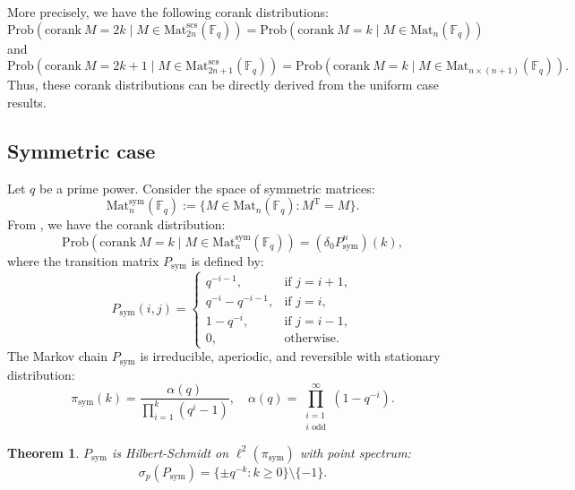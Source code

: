 \documentclass[a4]{amsart}
\newcommand{\Prob}{{\mathrm{Prob}}}
\newcommand{\Mat}{{\mathrm{Mat}}}
\newcommand{\scs}{\mathrm{scs}}
\newcommand{\corank}{\mathrm{corank~}}
\newcommand{\sym}{\mathrm{sym}}
\newcommand{\T}{\mathrm{T}}
\newtheorem{theorem}{Theorem}
\theoremstyle{remark} \newtheorem{remark}[theorem]{Remark}
\begin{document}
More precisely, we have the following corank distributions:
\[
\Prob(\corank M = 2k \mid M \in \Mat_{2n}^{\scs}(\mathbb{F}_q)) = \Prob(\corank M = k \mid M \in \Mat_n(\mathbb{F}_q))
\]
and
\[
\Prob(\corank M = 2k+1 \mid M \in \Mat_{2n+1}^{\scs}(\mathbb{F}_q)) = \Prob(\corank M = k \mid M \in \Mat_{n \times (n+1)}(\mathbb{F}_q)).
\]
Thus, these corank distributions can be directly derived from the uniform case results.



\medskip

\subsection{Symmetric case}
Let $q$ be a prime power. Consider the space of symmetric matrices:
\[
\Mat_n^\sym(\mathbb{F}_q) := \{M \in \Mat_n(\mathbb{F}_q) : M^\T = M\}.
\]
From \cite{gerthiii1986Limit}, we have the corank distribution:
\[
\Prob(\corank M = k \mid M \in \Mat_n^\sym(\mathbb{F}_q)) = (\delta_0 P_\sym^n)(k),
\]
where the transition matrix $P_\sym$ is defined by:
\[
P_\sym(i,j) = 
\begin{cases}
q^{-i-1}, & \text{if } j = i+1, \\
q^{-i} - q^{-i-1}, & \text{if } j = i, \\
1 - q^{-i}, & \text{if } j = i-1, \\
0, & \text{otherwise}.
\end{cases}
\]
The Markov chain $P_\sym$ is irreducible, aperiodic, and reversible with stationary distribution:
\[
\pi_\sym(k) = \frac{\alpha(q)}{\prod_{i=1}^k (q^i - 1)}, \quad \alpha(q) = \prod_{\substack{i=1 \\ i \text{ odd}}}^\infty (1 - q^{-i}).
\]

\begin{theorem}\label{thm:sym_spec}
$P_\sym$ is Hilbert-Schmidt on $\ell^2(\pi_\sym)$ with point spectrum:
\[
\sigma_p(P_\sym) = \{\pm q^{-k} : k \geq 0\} \setminus \{-1\}.
\]
\end{theorem}
\end{document}
